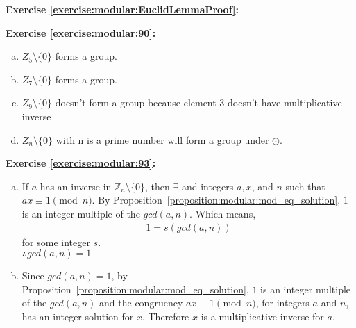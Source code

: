 \noindent\textbf{Exercise \ref{exercise:modular:EuclidLemmaProof}:}

\noindent\textbf{Exercise \ref{exercise:modular:90}:} 
\begin{enumerate}[(a)]
\item
 $Z_5 \setminus \{0\}$ forms a group.
 
\item
$Z_7 \setminus \{0\}$ forms a group.

\item
$Z_9 \setminus \{0\}$ doesn't form a group because element 3 doesn't have multiplicative inverse

\item
$Z_n \setminus \{0\}$ with n is a prime number will form a group under $\odot$.
\end{enumerate}

\noindent\textbf{Exercise \ref{exercise:modular:93}:} %
\begin{enumerate}[(a)]
\item  
If $a$ has an inverse in ${\mathbb{Z}_n} \setminus\{0\}$, then $\exists$ and integers $a, x$, and $n$ such that $ax\equiv 1 \pmod{n}$. By Proposition~\ref{proposition:modular:mod_eq_solution}, $1$ is an integer multiple of the $gcd(a,n)$. Which means,
\begin{align*}
1 = s(gcd(a,n))
\end{align*}
for some integer $s$.\\
$\therefore gcd(a,n) = 1$

\item 
Since $gcd(a,n) = 1$, by Proposition~\ref{proposition:modular:mod_eq_solution}, $1$ is an integer multiple of the $gcd(a,n)$ and the congruency $ax\equiv 1 \pmod{n}$, for integers $a$ and $n$, has an integer solution for $x$. Therefore $x$ is a multiplicative inverse for $a$.
\end{enumerate}

